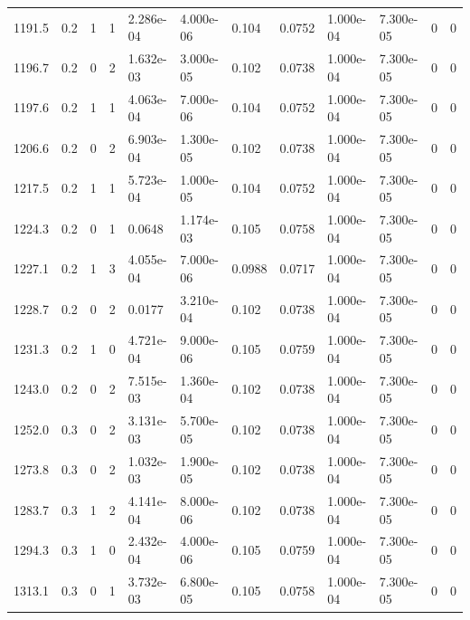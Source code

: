 \documentclass[preview]{standalone}
\begin{document}
{{{\begin{tabular}{L{1.2cm}C{1.2cm} C{0.3cm}C{0.5cm} C{1.4cm}C{1.4cm} C{1.4cm}C{1.4cm} C{1.6cm}C{1.6cm} C{1.6cm}C{1.6cm}}
  1191.5  &   0.2  & 1     &  1 &  2.286e-04  & 4.000e-06  &  0.104&   0.0752& 1.000e-04 & 7.300e-05   &  0 & 0  \\ 
  1196.7  &   0.2  & 0     &  2 &  1.632e-03  & 3.000e-05  &  0.102&   0.0738& 1.000e-04 & 7.300e-05   &  0 & 0  \\ 
  1197.6  &   0.2  & 1     &  1 &  4.063e-04  & 7.000e-06  &  0.104&   0.0752& 1.000e-04 & 7.300e-05   &  0 & 0  \\ 
  1206.6  &   0.2  & 0     &  2 &  6.903e-04  & 1.300e-05  &  0.102&   0.0738& 1.000e-04 & 7.300e-05   &  0 & 0  \\ 
  1217.5  &   0.2  & 1     &  1 &  5.723e-04  & 1.000e-05  &  0.104&   0.0752& 1.000e-04 & 7.300e-05   &  0 & 0  \\ 
  1224.3  &   0.2  & 0     &  1 &  0.0648  & 1.174e-03  &  0.105&   0.0758& 1.000e-04 & 7.300e-05   &  0 & 0  \\ 
  1227.1  &   0.2  & 1     &  3 &  4.055e-04  & 7.000e-06  &  0.0988&   0.0717& 1.000e-04 & 7.300e-05   &  0 & 0  \\ 
  1228.7  &   0.2  & 0     &  2 &  0.0177  & 3.210e-04  &  0.102&   0.0738& 1.000e-04 & 7.300e-05   &  0 & 0  \\ 
  1231.3  &   0.2  & 1     &  0 &  4.721e-04  & 9.000e-06  &  0.105&   0.0759& 1.000e-04 & 7.300e-05   &  0 & 0  \\ 
  1243.0  &   0.2  & 0     &  2 &  7.515e-03  & 1.360e-04  &  0.102&   0.0738& 1.000e-04 & 7.300e-05   &  0 & 0  \\ 
  1252.0  &   0.3  & 0     &  2 &  3.131e-03  & 5.700e-05  &  0.102&   0.0738& 1.000e-04 & 7.300e-05   &  0 & 0  \\ 
  1273.8  &   0.3  & 0     &  2 &  1.032e-03  & 1.900e-05  &  0.102&   0.0738& 1.000e-04 & 7.300e-05   &  0 & 0  \\ 
  1283.7  &   0.3  & 1     &  2 &  4.141e-04  & 8.000e-06  &  0.102&   0.0738& 1.000e-04 & 7.300e-05   &  0 & 0  \\ 
  1294.3  &   0.3  & 1     &  0 &  2.432e-04  & 4.000e-06  &  0.105&   0.0759& 1.000e-04 & 7.300e-05   &  0 & 0  \\ 
  1313.1  &   0.3  & 0     &  1 &  3.732e-03  & 6.800e-05  &  0.105&   0.0758& 1.000e-04 & 7.300e-05   &  0 & 0  \\ 
\hline 
\end{tabular} 

}}}
\end{document}
